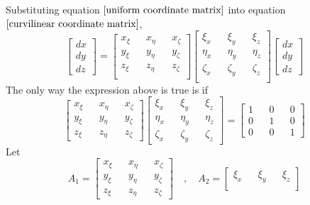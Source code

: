 \documentclass[a4paper, 12pt]{report}
\begin{document}
\begin{center}
\begin{equation}
\label{uniform coordinate matrix}
\end{equation}
Substituting equation $\ref{uniform coordinate matrix}$ into equation $\ref{curvilinear coordinate matrix}$,
$$\begin{bmatrix}
dx \\ dy \\ dz
\end{bmatrix} = \begin{bmatrix}
x_{\xi} && x_{\eta} && x_{\zeta} \\
y_{\xi} && y_{\eta} && y_{\zeta} \\
z_{\xi} && z_{\eta} && z_{\zeta} \\
\end{bmatrix}\begin{bmatrix}
\xi_{x} && \xi_{y} && \xi_{z} \\
\eta_{x} && \eta_{y} && \eta_{z} \\
\zeta_{x} && \zeta_{y} && \zeta_{z} \\
\end{bmatrix}\begin{bmatrix}
dx \\ dy \\ dz
\end{bmatrix}$$
The only way the expression above is true is if
$$\begin{bmatrix}
x_{\xi} && x_{\eta} && x_{\zeta} \\
y_{\xi} && y_{\eta} && y_{\zeta} \\
z_{\xi} && z_{\eta} && z_{\zeta} 
\end{bmatrix}\begin{bmatrix}
\xi_{x} && \xi_{y} && \xi_{z} \\
\eta_{x} && \eta_{y} && \eta_{z} \\
\zeta_{x} && \zeta_{y} && \zeta_{z}
\end{bmatrix} = \begin{bmatrix}
1 && 0 && 0 \\
0 && 1 && 0 \\
0 && 0 && 1
\end{bmatrix}$$
Let 
$$A_{1} = \begin{bmatrix}
x_{\xi} && x_{\eta} && x_{\zeta} \\
y_{\xi} && y_{\eta} && y_{\zeta} \\
z_{\xi} && z_{\eta} && z_{\zeta} 
\end{bmatrix} \quad,\quad A_{2} = \begin{bmatrix}
\xi_{x} && \xi_{y} && \xi_{z} \\

\end{bmatrix}$$
\end{center}
\end{document}
